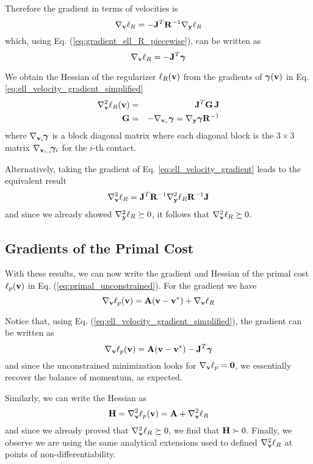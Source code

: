 Therefore the gradient in terms of velocities is
\begin{equation}
	\nabla_\mf{v}\ell_R = -\mf{J}^T\mf{R}^{-1}\nabla_\mf{y}\ell_R
	\label{eq:ell_velocity_gradient}
\end{equation}
which, using Eq. (\ref{eq:gradient_ell_R_piecewise}), can be written as
\begin{equation}
	\nabla_\mf{v}\ell_R = -\mf{J}^T\bgamma
	\label{eq:ell_velocity_gradient_simplified}
\end{equation}

We obtain the Hessian of the regularizer $\ell_R({\mathbf{v}})$ from the
gradients of ${\bm\gamma}({\mathbf{v}})$ in Eq. \eqref{eq:ell_velocity_gradient_simplified}
\begin{eqnarray}
	\nabla_\mf{v}^2\ell_R(\mf{v}) &=& \mf{J}^T\mf{G}\,\mf{J}\nonumber\\
	\mf{G} &=&-\nabla_{\mf{v}_c}\bgamma = \nabla_\mf{y}\bgamma \mf{R}^{-1}
	\label{eq:ellR_hessian}
\end{eqnarray}
where $\nabla_{{\mathbf{v}}_c}\!{\bm\gamma}$ is a block diagonal matrix where each
diagonal block is the $3\times 3$ matrix $\nabla_{{\mathbf{v}}_{c,i}}\!{\bm\gamma}_i$
for the $i\text{-th}$ contact.

Alternatively, taking the gradient of Eq. \eqref{eq:ell_velocity_gradient} leads to the equivalent result
\begin{equation}
	\nabla_\mf{v}^2\ell_R = \mf{J}^T\mf{R}^{-1}\nabla_\mf{y}^2\ell_R\mf{R}^{-1}\mf{J}
	\label{eq:ell_velocity_hessian}
\end{equation}
and since we already showed $\nabla_{\mathbf{y}}^2\ell_R\succeq 0$, it follows that
$\nabla_{\mathbf{v}}^2\ell_R\succeq 0$.


\subsection{Gradients of the Primal Cost}
With these results, we can now write the gradient and Hessian of the primal cost
$\ell_p({\mathbf{v}})$ in Eq. (\ref{eq:primal_unconstrained}). For the gradient we
have
\begin{equation}
	\nabla_{\mathbf{v}}\ell_p({\mathbf{v}}) = {\mathbf{A}}({\mathbf{v}}-{\mathbf{v}}^*) + \nabla_{\mathbf{v}}\ell_R
\end{equation}

Notice that, using Eq. (\ref{eq:ell_velocity_gradient_simplified}), the gradient
can be written as
\begin{equation}
	\nabla_{\mathbf{v}}\ell_p({\mathbf{v}}) = {\mathbf{A}}({\mathbf{v}}-{\mathbf{v}}^*) - {\mathbf{J}}^T{\bm\gamma}
\end{equation}
and since the unconstrained minimization looks for $\nabla_{\mathbf{v}}\ell_p={\mathbf{0}}$,
we essentially recover the balance of momentum, as expected.

Similarly, we can write the Hessian as
\begin{equation}
	{\mathbf{H}} = \nabla_{\mathbf{v}}^2\ell_p({\mathbf{v}}) = {\mathbf{A}} + \nabla_{\mathbf{v}}^2\ell_R
\end{equation}
and since we already proved that $\nabla_{\mathbf{v}}^2\ell_R\succeq 0$, we find that
 ${\mathbf{H}}\succ 0$. Finally, we observe we are using the same analytical
 extensions used to defined $\nabla_{\mathbf{v}}^2\ell_R$ at points of
 non-differentiability.
